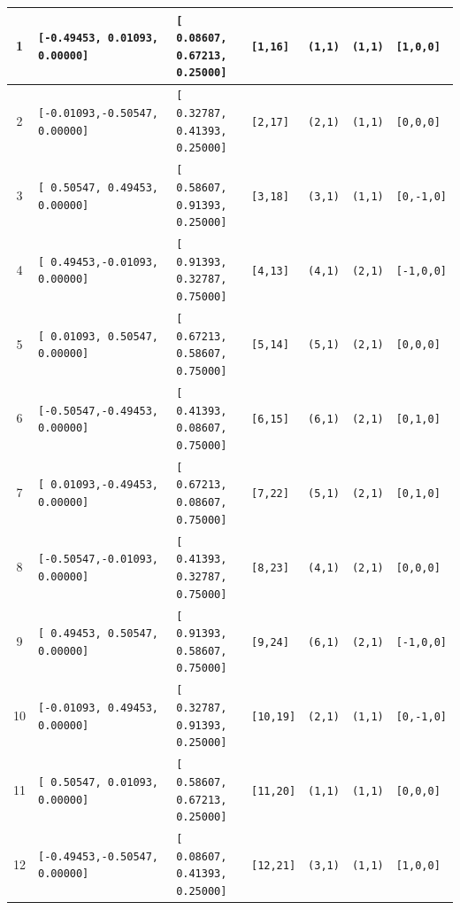 \documentclass[fleqn,10pt,landscape]{jsarticle}
\begin{document}
\begin{longtable}[l]{cllllll}
1 & \texttt{[-0.49453, 0.01093, 0.00000]} & \texttt{[ 0.08607, 0.67213, 0.25000]} & \texttt{[1,16]} & \texttt{(1,1)} & \texttt{(1,1)} & \texttt{[1,0,0]} \\ \hline
2 & \texttt{[-0.01093,-0.50547, 0.00000]} & \texttt{[ 0.32787, 0.41393, 0.25000]} & \texttt{[2,17]} & \texttt{(2,1)} & \texttt{(1,1)} & \texttt{[0,0,0]} \\ \hline
3 & \texttt{[ 0.50547, 0.49453, 0.00000]} & \texttt{[ 0.58607, 0.91393, 0.25000]} & \texttt{[3,18]} & \texttt{(3,1)} & \texttt{(1,1)} & \texttt{[0,-1,0]} \\ \hline
4 & \texttt{[ 0.49453,-0.01093, 0.00000]} & \texttt{[ 0.91393, 0.32787, 0.75000]} & \texttt{[4,13]} & \texttt{(4,1)} & \texttt{(2,1)} & \texttt{[-1,0,0]} \\ \hline
5 & \texttt{[ 0.01093, 0.50547, 0.00000]} & \texttt{[ 0.67213, 0.58607, 0.75000]} & \texttt{[5,14]} & \texttt{(5,1)} & \texttt{(2,1)} & \texttt{[0,0,0]} \\ \hline
6 & \texttt{[-0.50547,-0.49453, 0.00000]} & \texttt{[ 0.41393, 0.08607, 0.75000]} & \texttt{[6,15]} & \texttt{(6,1)} & \texttt{(2,1)} & \texttt{[0,1,0]} \\ \hline
7 & \texttt{[ 0.01093,-0.49453, 0.00000]} & \texttt{[ 0.67213, 0.08607, 0.75000]} & \texttt{[7,22]} & \texttt{(5,1)} & \texttt{(2,1)} & \texttt{[0,1,0]} \\ \hline
8 & \texttt{[-0.50547,-0.01093, 0.00000]} & \texttt{[ 0.41393, 0.32787, 0.75000]} & \texttt{[8,23]} & \texttt{(4,1)} & \texttt{(2,1)} & \texttt{[0,0,0]} \\ \hline
9 & \texttt{[ 0.49453, 0.50547, 0.00000]} & \texttt{[ 0.91393, 0.58607, 0.75000]} & \texttt{[9,24]} & \texttt{(6,1)} & \texttt{(2,1)} & \texttt{[-1,0,0]} \\ \hline
10 & \texttt{[-0.01093, 0.49453, 0.00000]} & \texttt{[ 0.32787, 0.91393, 0.25000]} & \texttt{[10,19]} & \texttt{(2,1)} & \texttt{(1,1)} & \texttt{[0,-1,0]} \\ \hline
11 & \texttt{[ 0.50547, 0.01093, 0.00000]} & \texttt{[ 0.58607, 0.67213, 0.25000]} & \texttt{[11,20]} & \texttt{(1,1)} & \texttt{(1,1)} & \texttt{[0,0,0]} \\ \hline
12 & \texttt{[-0.49453,-0.50547, 0.00000]} & \texttt{[ 0.08607, 0.41393, 0.25000]} & \texttt{[12,21]} & \texttt{(3,1)} & \texttt{(1,1)} & \texttt{[1,0,0]} \\
\end{longtable}
\renewcommand{\arraystretch}{1.6}
\end{document}
